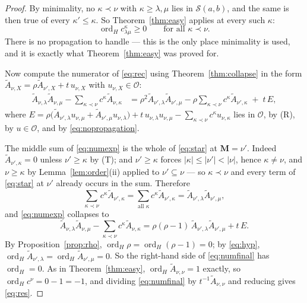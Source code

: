 \documentclass[11pt]{article}
\theoremstyle{plain}
\theoremstyle{definition}
\theoremstyle{remark}
\theoremstyle{plain}
\newcommand{\bM}{\mathbf{M}}
\newcommand{\At}{\widetilde{A}}
\newcommand{\ord}{\operatorname{ord}}
\begin{document}
\begin{proof}
By minimality, no $\kappa\prec\nu$ with $\kappa\ge\lambda,\mu$ lies in
$\mathcal{S}(a,b)$, and the same is then true of every $\kappa'\le\kappa$.  So
Theorem~\ref{thm:easy} applies at every such $\kappa$:
\begin{equation}
\ord_Hc^{\kappa}_{\lambda\mu}\ge0\qquad\text{for all }\kappa\prec\nu .
\label{eq:nopropagation}
\end{equation}
There is no propagation to handle --- this is the only place minimality is
used, and it is exactly what Theorem~\ref{thm:easy} was proved for.

Now compute the numerator of \eqref{eq:rec} using
Theorem~\ref{thm:collapse} in the form
$\At_{\nu,X}=\rho\At_{\nu',X}+t\,u_{\nu,X}$ with $u_{\nu,X}\in\mathcal{O}$:
\begin{align}
\At_{\nu,\lambda}\At_{\nu,\mu}-\sum_{\kappa\prec\nu}c^{\kappa}\At_{\nu,\kappa}
&=\rho^2\At_{\nu',\lambda}\At_{\nu',\mu}
 -\rho\sum_{\kappa\prec\nu}c^{\kappa}\At_{\nu',\kappa}
 \;+\;t\,E,
\label{eq:numexp}
\end{align}
where
$E=\rho\bigl(\At_{\nu',\lambda}u_{\nu,\mu}+\At_{\nu',\mu}u_{\nu,\lambda}\bigr)
 +t\,u_{\nu,\lambda}u_{\nu,\mu}
 -\sum_{\kappa\prec\nu}c^{\kappa}u_{\nu,\kappa}$
lies in $\mathcal{O}$, by (R), by $u\in\mathcal{O}$, and by
\eqref{eq:nopropagation}.

The middle sum of \eqref{eq:numexp} is the whole of \eqref{eq:star} at
$\bM=\nu'$.  Indeed $\At_{\nu',\kappa}=0$ unless $\nu'\ge\kappa$ by (T); and
$\nu'\ge\kappa$ forces $|\kappa|\le|\nu'|<|\nu|$, hence $\kappa\ne\nu$, and
$\nu\ge\kappa$ by Lemma~\ref{lem:order}(ii) applied to
$\nu'\subseteq\nu$ --- so $\kappa\prec\nu$ and every term of
\eqref{eq:star} at $\nu'$ already occurs in the sum.  Therefore
\[
\sum_{\kappa\prec\nu}c^{\kappa}\At_{\nu',\kappa}
=\sum_{\text{all }\kappa}c^{\kappa}\At_{\nu',\kappa}
=\At_{\nu',\lambda}\At_{\nu',\mu},
\]
and \eqref{eq:numexp} collapses to
\begin{equation}
\At_{\nu,\lambda}\At_{\nu,\mu}-\sum_{\kappa\prec\nu}c^{\kappa}\At_{\nu,\kappa}
=\rho(\rho-1)\,\At_{\nu',\lambda}\At_{\nu',\mu}+t\,E .
\label{eq:numfinal}
\end{equation}
By Proposition~\ref{prop:rho}, $\ord_H\rho=\ord_H(\rho-1)=0$; by
\eqref{eq:hyp}, $\ord_H\At_{\nu',\lambda}=\ord_H\At_{\nu',\mu}=0$.  So the
right-hand side of \eqref{eq:numfinal} has $\ord_H=0$.  As in
Theorem~\ref{thm:easy}, $\ord_H\At_{\nu,\nu}=1$ exactly, so
$\ord_Hc^{\nu}=0-1=-1$, and dividing \eqref{eq:numfinal} by
$t^{-1}\At_{\nu,\nu}$ and reducing gives \eqref{eq:res}.
\end{proof}
\end{document}

